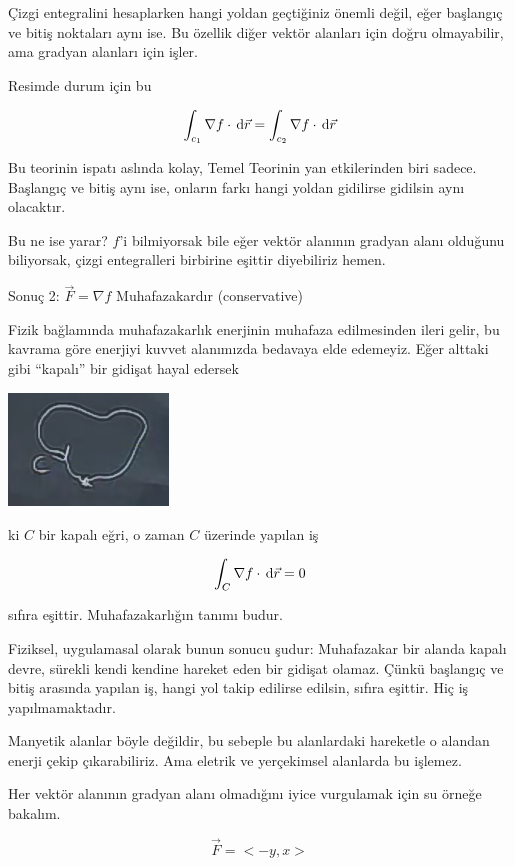 \documentclass[12pt,fleqn]{article}\usepackage{../../common}
\begin{document}
Çizgi entegralini hesaplarken hangi yoldan geçtiğiniz önemli değil, eğer
başlangıç ve bitiş noktaları aynı ise. Bu özellik diğer vektör alanları
için doğru olmayabilir, ama gradyan alanları için işler.

Resimde durum için bu

$$ \int_{c_1}\nabla f \cdot \,\mathrm{d}\vec{r} =  \int_{c_2}\nabla f \cdot \,\mathrm{d}\vec{r} $$

Bu teorinin ispatı aslında kolay, Temel Teorinin yan etkilerinden biri
sadece. Başlangıç ve bitiş aynı ise, onların farkı hangi yoldan gidilirse
gidilsin aynı olacaktır.

Bu ne ise yarar? $f$'i bilmiyorsak bile eğer vektör alanının gradyan alanı
olduğunu biliyorsak, çizgi entegralleri birbirine eşittir diyebiliriz hemen. 

Sonuç 2: $\vec{F} = \nabla f$ Muhafazakardır (conservative)

Fizik bağlamında muhafazakarlık enerjinin muhafaza edilmesinden ileri
gelir, bu kavrama göre enerjiyi kuvvet alanımızda bedavaya elde
edemeyiz. Eğer alttaki gibi ``kapalı'' bir gidişat hayal edersek

\begin{center}
\includegraphics[height=3cm]{20_8.png}
\end{center}

ki $C$ bir kapalı eğri, o zaman $C$ üzerinde yapılan iş

$$ \int_{C}\nabla f \cdot \,\mathrm{d}\vec{r} = 0$$

sıfıra eşittir. Muhafazakarlığın tanımı budur. 

Fiziksel, uygulamasal olarak bunun sonucu şudur: Muhafazakar bir alanda
kapalı devre, sürekli kendi kendine hareket eden bir gidişat olamaz. Çünkü
başlangıç ve bitiş arasında yapılan iş, hangi yol takip edilirse edilsin,
sıfıra eşittir. Hiç iş yapılmamaktadır. 

Manyetik alanlar böyle değildir, bu sebeple bu alanlardaki hareketle o
alandan enerji çekip çıkarabiliriz. Ama eletrik ve yerçekimsel alanlarda bu
işlemez. 

Her vektör alanının gradyan alanı olmadığını iyice vurgulamak için su
örneğe bakalım. 

$$ \vec{F} = <-y,x> $$
\end{document}
